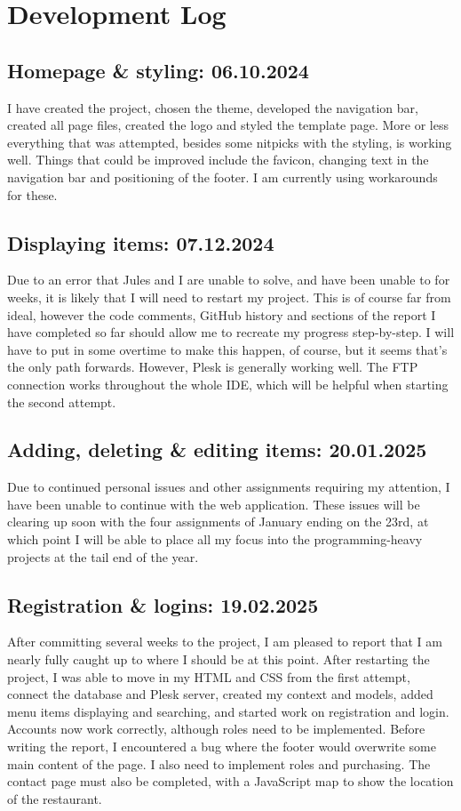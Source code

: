 \documentclass{article}
\begin{document}
\section{Development Log}
\subsection{Homepage \& styling: 06.10.2024}
I have created the project, chosen the theme, developed the navigation bar, created all page files, created the logo and styled the template page. More or less everything that was attempted, besides some nitpicks with the styling, is working well. Things that could be improved include the favicon, changing text in the navigation bar and positioning of the footer. I am currently using workarounds for these.

\subsection{Displaying items: 07.12.2024}
 Due to an error that Jules and I are unable to solve, and have been unable to for weeks, it is likely that I will need to restart my project. This is of course far from ideal, however the code comments, GitHub history and sections of the report I have completed so far should allow me to recreate my progress step-by-step. I will have to put in some overtime to make this happen, of course, but it seems that’s the only path forwards. However, Plesk is generally working well. The FTP connection works throughout the whole IDE, which will be helpful when starting the second attempt.


\subsection{Adding, deleting \& editing items: 20.01.2025}
Due to continued personal issues and other assignments requiring my attention, I have been unable to continue with the web application. These issues will be clearing up soon with the four assignments of January ending on the 23rd, at which point I will be able to place all my focus into the programming-heavy projects at the tail end of the year.

\subsection{Registration \& logins: 19.02.2025}
After committing several weeks to the project, I am pleased to report that I am nearly fully caught up to where I should be at this point. After restarting the project, I was able to move in my HTML and CSS from the first attempt, connect the database and Plesk server, created my context and models, added menu items displaying and searching, and started work on registration and login. Accounts now work correctly, although roles need to be implemented. Before writing the report, I encountered a bug where the footer would overwrite some main content of the page. I also need to implement roles and purchasing. The contact page must also be completed, with a JavaScript map to show the location of the restaurant.
\end{document}
